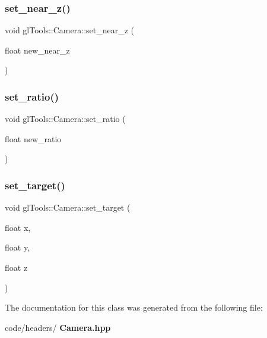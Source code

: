 \mbox{\label{classgl_tools_1_1_camera_a0f24b2117041e292e5b6201ce0cfa22c}} 
\subsubsection{set\_near\_z()}
{\footnotesize\ttfamily void gl\+Tools\+::\+Camera\+::set\+\_\+near\+\_\+z (\begin{DoxyParamCaption}\item[{float}]{new\+\_\+near\+\_\+z }\end{DoxyParamCaption})\hspace{0.3cm}{\ttfamily [inline]}}

\mbox{\label{classgl_tools_1_1_camera_a0e4413c8ecba241240408f66ef4f3232}} 
\subsubsection{set\_ratio()}
{\footnotesize\ttfamily void gl\+Tools\+::\+Camera\+::set\+\_\+ratio (\begin{DoxyParamCaption}\item[{float}]{new\+\_\+ratio }\end{DoxyParamCaption})\hspace{0.3cm}{\ttfamily [inline]}}

\mbox{\label{classgl_tools_1_1_camera_ac47d3a72ec5121a45d5275b1f3464e87}} 
\subsubsection{set\_target()}
{\footnotesize\ttfamily void gl\+Tools\+::\+Camera\+::set\+\_\+target (\begin{DoxyParamCaption}\item[{float}]{x,  }\item[{float}]{y,  }\item[{float}]{z }\end{DoxyParamCaption})\hspace{0.3cm}{\ttfamily [inline]}}



The documentation for this class was generated from the following file\+:\begin{DoxyCompactItemize}
\item 
code/headers/\textbf{ Camera.\+hpp}\end{DoxyCompactItemize}
